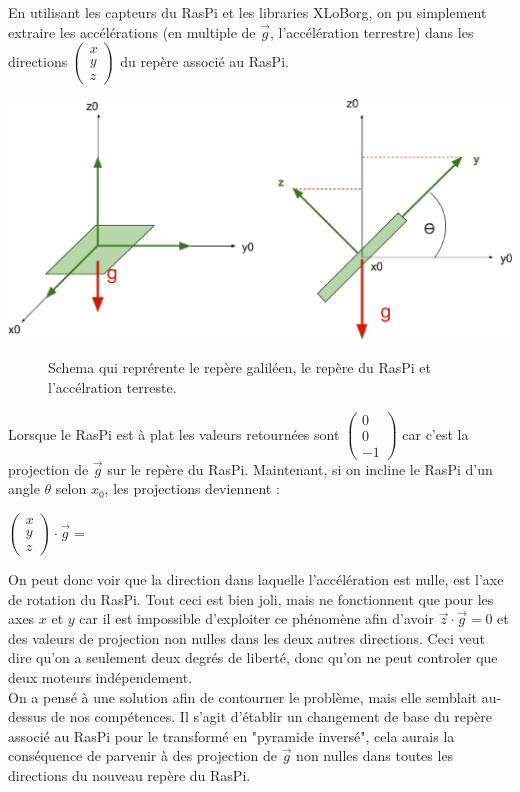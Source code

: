 \documentclass[twoside,twocolumn, 16pt]{article}
\newcommand{\icol}[1]{%
  \left(\begin{smallmatrix}#1\end{smallmatrix}\right)%
}
\begin{document}
En utilisant les capteurs du RasPi et les libraries XLoBorg, on pu simplement extraire les accélérations (en multiple de $\vec{g}$, l'accélération terrestre) dans les directions $\icol{x\\y\\z}$ du repère associé au RasPi. 
\begin{center}
\includegraphics [scale = 0.23] {acc.eps}
\begin{figure}[!h]
\caption{Schema qui reprérente le repère galiléen, le repère du RasPi et l'accélration terreste.}
\end{figure}
\end{center}
Lorsque le RasPi est à plat les valeurs retournées sont $\icol{0\\0\\-1}$ car c'est la projection de $\vec{g}$ sur le repère du RasPi. Maintenant, si on incline le RasPi d'un angle $\theta$ selon $x_0$, les projections deviennent :
\begin{center}
$\icol{x\\y\\z} \cdot \vec{g} =$  \\
\end{center}
\indent On peut donc voir que la direction dans laquelle l'accélération est nulle, est l'axe de rotation du RasPi. Tout ceci est bien joli, mais ne fonctionnent que pour les axes $x$ et $y$ car il est impossible d'exploiter ce phénomène afin d'avoir  $\vec{z} \cdot \vec{g} = 0$ et des valeurs de projection non nulles dans les deux autres directions. Ceci veut dire qu'on a seulement deux degrés de liberté, donc qu'on ne peut controler que deux moteurs indépendement. \\
\indent On a pensé à une solution afin de contourner le problème, mais elle semblait au-dessus de nos compétences. Il s'agit d'établir un changement de base du repère associé au RasPi pour le transformé en "pyramide inversé", cela aurais la conséquence de parvenir à des projection de $\vec{g}$ non nulles dans toutes les directions du nouveau repère du RasPi.
\end{document}
